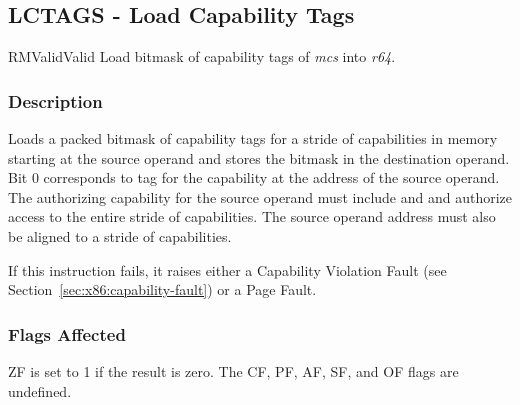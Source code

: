 \clearpage
{}
{}
\subsection*{LCTAGS - Load Capability Tags}

\begin{x86opcodetable}
  {RM}{Valid}{Valid}
  {Load bitmask of capability tags of \emph{mcs} into \emph{r64}.}
\end{x86opcodetable}

\begin{x86opentable}
\end{x86opentable}

\subsubsection*{Description}

Loads a packed bitmask of capability tags for a stride of capabilities
in memory starting at the source operand and stores the bitmask in the
destination operand.  Bit 0 corresponds to tag for the capability at
the address of the source operand.  The authorizing capability for the
source operand must include \cappermL{} and \cappermLC{} and authorize
access to the entire stride of capabilities.  The source operand
address must also be aligned to a stride of capabilities.

If this instruction fails, it raises either a Capability Violation
Fault (see Section~\ref{sec:x86:capability-fault}) or a Page Fault.

\subsubsection*{Flags Affected}

ZF is set to 1 if the result is zero.  The CF, PF, AF, SF, and OF
flags are undefined.
